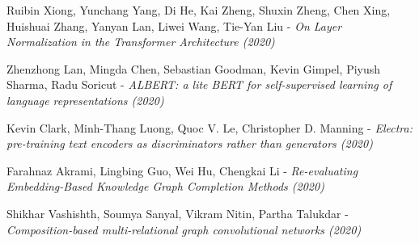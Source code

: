 \documentclass[longabstract, english, mgr]{iithesis}
\theoremstyle{default_theorem_style}\newtheorem{theorem}{Theorem}
\theoremstyle{default_theorem_style}\newtheorem{definition}{Definition}
\begin{document}
\begin{thebibliography}{99}
Ruibin Xiong, Yunchang Yang,  Di He, Kai Zheng, Shuxin Zheng, Chen Xing, Huishuai Zhang, Yanyan Lan,
Liwei Wang, Tie-Yan Liu - \textit{On Layer Normalization in the Transformer Architecture (2020)}

Zhenzhong Lan, Mingda Chen, Sebastian Goodman, Kevin Gimpel, Piyush Sharma, Radu Soricut - \textit{ALBERT: a
lite BERT for self-supervised learning of language representations (2020)}

Kevin Clark, Minh-Thang Luong, Quoc V. Le, Christopher D. Manning - \textit{Electra: pre-training text encoders
as discriminators rather than generators (2020)}

Farahnaz Akrami, Lingbing Guo, Wei Hu, Chengkai Li - \textit{Re-evaluating Embedding-Based Knowledge Graph
Completion Methods (2020)}

Shikhar Vashishth, Soumya Sanyal, Vikram Nitin, Partha Talukdar - \textit{Composition-based multi-relational graph
convolutional networks (2020)}

\end{thebibliography}
\end{document}
